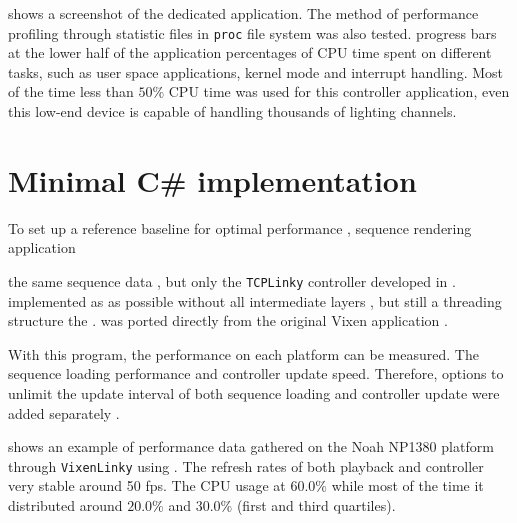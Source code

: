  shows a screenshot of the dedicated application. The method of performance profiling through statistic files in  \texttt{proc} file system was also tested.  progress bars at the lower half of the application  percentages of CPU time spent on different tasks, such as user space applications, kernel mode and interrupt handling. Most of the time less than $50 \%$ CPU time was used for this controller application,  even this low-end device is capable of handling thousands of lighting channels.

\section{Minimal C\# implementation}

To set up a reference baseline for optimal performance ,  sequence rendering application 


 the same  sequence data , but  only the \texttt{TCPLinky} controller developed in .  implemented as  as possible without all intermediate layers , but still  a threading structure  the .  was ported directly from the original Vixen application .


With this program, the  performance  on each platform can be measured. The  sequence loading performance and controller update speed. Therefore, options to unlimit the update interval of both sequence loading and controller update were added separately .

 shows an example of performance data gathered on the Noah NP1380 platform through \texttt{VixenLinky} using . The refresh rates of both playback and controller  very stable around  50 fps. The CPU usage  at $60.0 \%$\ca{,} while most of the time it  distributed around $20.0 \%$ and $30.0 \%$ (first and third quartiles).


